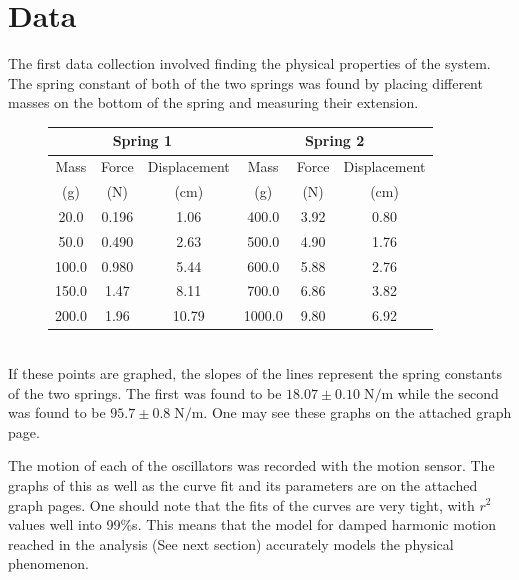 \documentclass[11pt]{article}
\begin{document}
\section{Data}
The first data collection involved finding the physical properties of the system. The spring constant of both of the two springs was found by placing different masses on the bottom of the spring and measuring their extension. 
\begin{figure}[h]
	\centering
	\begin{tabular}{|c|c|c|c|c|c|}
		\hline 
		\multicolumn{3}{|c|}{Spring 1} & \multicolumn{3}{|c|}{Spring 2}\\
		\hline 
		Mass & Force & Displacement & Mass & Force  & Displacement  \\
		(g) & (N) & (cm) & (g) & (N) & (cm) \\
		\hline 
		20.0 & 0.196 & 1.06 & 400.0 & 3.92 & 0.80 \\ 
		\hline 
		50.0 & 0.490 & 2.63 & 500.0 & 4.90 & 1.76 \\ 
		\hline 
		100.0 & 0.980 & 5.44 & 600.0 & 5.88 & 2.76 \\ 
		\hline 
		150.0 & 1.47 & 8.11 & 700.0 & 6.86 & 3.82 \\ 
		\hline 
		200.0 & 1.96 & 10.79 & 1000.0 & 9.80 & 6.92 \\ 
		\hline 
	\end{tabular} 
\end{figure}
\\
If these points are graphed, the slopes of the lines represent the spring constants of the two springs. The first was found to be \(18.07 \pm 0.10 \; \mathrm{N}/\mathrm{m} \) while the second was found to be \(95.7 \pm 0.8 \; \mathrm{N}/\mathrm{m} \). One may see these graphs on the attached graph page.

The motion of each of the oscillators was recorded with the motion sensor. The graphs of this as well as the curve fit and its parameters are on the attached graph pages. One should note that the fits of the curves are very tight, with \(r^2\) values well into 99\%s. This means that the model for damped harmonic motion reached in the analysis (See next section) accurately models the physical phenomenon.  
\end{document}
